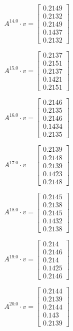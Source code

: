 \documentclass{article}
\begin{document}
      $$A^{14.0} \cdot v = \begin{bmatrix}
      0.2149\\
      0.2132\\
      0.2149\\
      0.1437\\
      0.2132
      \end{bmatrix}
      $$
      
      $$A^{15.0} \cdot v = \begin{bmatrix}
      0.2137\\
      0.2151\\
      0.2137\\
      0.1421\\
      0.2151
      \end{bmatrix}
      $$
      
      $$A^{16.0} \cdot v = \begin{bmatrix}
      0.2146\\
      0.2135\\
      0.2146\\
      0.1434\\
      0.2135
      \end{bmatrix}
      $$
      
      $$A^{17.0} \cdot v = \begin{bmatrix}
      0.2139\\
      0.2148\\
      0.2139\\
      0.1423\\
      0.2148
      \end{bmatrix}
      $$
      
      $$A^{18.0} \cdot v = \begin{bmatrix}
      0.2145\\
      0.2138\\
      0.2145\\
      0.1432\\
      0.2138
      \end{bmatrix}
      $$
      
      $$A^{19.0} \cdot v = \begin{bmatrix}
      0.214\\
      0.2146\\
      0.214\\
      0.1425\\
      0.2146
      \end{bmatrix}
      $$
      
      $$A^{20.0} \cdot v = \begin{bmatrix}
      0.2144\\
      0.2139\\
      0.2144\\
      0.143\\
      0.2139
      \end{bmatrix}
      $$
      
\end{document}
